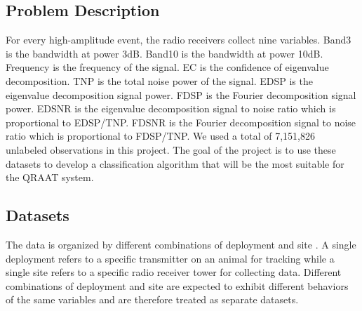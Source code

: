 \documentclass[twoside]{article}
\begin{document}
\subsection{Problem Description}
For every high-amplitude event, the radio receivers collect nine variables. Band3 is the bandwidth at power 3dB. Band10 is the bandwidth at power 10dB. Frequency is the frequency of the signal. EC is the confidence of eigenvalue decomposition. TNP is the total noise power of the signal. EDSP is the eigenvalue decomposition signal power. FDSP is the Fourier decomposition signal power. EDSNR is the eigenvalue decomposition signal to noise ratio which is proportional to EDSP/TNP. FDSNR is the Fourier decomposition signal to noise ratio which is proportional to FDSP/TNP. We used a total of 7,151,826 unlabeled observations in this project. The goal of the project is to use these datasets to develop a classification algorithm that will be the most suitable for the QRAAT system. 

\subsection{Datasets}
The data is organized by different combinations of deployment and site . A single deployment refers to a specific transmitter on an animal for tracking while a single site refers to a specific radio receiver tower for collecting data. Different combinations of deployment and site are expected to exhibit different behaviors of the same variables and are therefore treated as separate datasets. 
\end{document}
